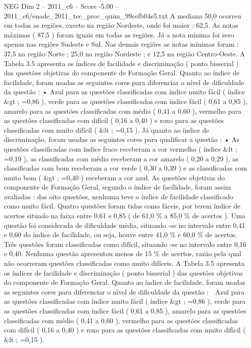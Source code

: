 \begin{textsample}{NEG Dim 2 – 2011\_c6 – Score -5.00 – 2011\_c6/enade\_2011\_tec\_proc\_quim\_99cefb04e5.txt}
A mediana 50,0 ocorreu em todas as regiões, exceto na região Nordeste, onde foi maior : 62,5.
As notas máximas ( 87,5 ) foram iguais em todas as regiões.
Já a nota mínima foi zero apenas nas regiões Sudeste e Sul.
Nas demais regiões as notas mínimas foram : 37,5 na região Norte ; 25,0 na região Nordeste ; e 12,5 na região Centro-Oeste.
A Tabela 3.5 apresenta os índices de facilidade e discriminação ( ponto bisserial ) das questões objetivas do componente de Formação Geral.
Quanto ao índice de facilidade, foram usadas as seguintes cores para diferenciar o nível de dificuldade da questão : • Azul para as questões classificadas com índice muito fácil ( índice \&gt ; =0,86 ), verde para as questões classificadas com índice fácil ( 0,61 a 0,85 ), amarelo para as questões classificadas com médio ( 0,41 a 0,60 ), vermelho para as questões classificadas com difícil ( 0,16 a 0,40 ) e roxo para as questões classificadas com muito difícil ( \&lt ; =0,15 ).
Já quanto ao índice de discriminação, foram usadas as seguintes cores para qualificar a questão : • As questões classificadas com índice fraco receberam a cor vermelho ( índice \&lt ; =0,19 ), as classificadas com médio receberam a cor amarelo ( 0,20 a 0,29 ), as classificadas com bom receberam a cor verde ( 0,30 a 0,39 ) e as classificadas com muito bom ( \&gt ; =0,40 ) receberam a cor azul.
As questões objetivas do componente de Formação Geral, segundo o índice de facilidade, foram assim avaliadas : das oito questões, nenhuma teve o índice de facilidade classificado como muito fácil.
Quatro questões foram tidas como fáceis, por terem índice de acertos situado na faixa entre 0,61 e 0,85 ( de 61,0 \% a 85,0 \% de acertos ).
Uma questão foi considerada de dificuldade média, situando -se no intervalo entre 0,41 e 0,60 do índice de facilidade, ou seja, houve entre 41,0 \% e 60,0 \% de acertos.
Três questões foram classificadas como difícil, situando -se no intervalo entre 0,16 e 0,40.
Nenhuma questão apresentou menos de 15 \% de acertos, razão pela qual não ocorreram questões classificadas como muito difíceis.
A Tabela 3.5 apresenta os índices de facilidade e discriminação ( ponto bisserial ) das questões objetivas do componente de Formação Geral.
Quanto ao índice de facilidade, foram usadas as seguintes cores para diferenciar o nível de dificuldade da questão :  Azul para as questões classificadas com índice muito fácil ( índice \&gt ; =0,86 ), verde para as questões classificadas com índice fácil ( 0,61 a 0,85 ), amarelo para as questões classificadas com médio ( 0,41 a 0,60 ), vermelho para as questões classificadas com difícil ( 0,16 a 0,40 ) e roxo para as questões classificadas com muito difícil ( \&lt ; =0,15 ).

\end{textsample}
